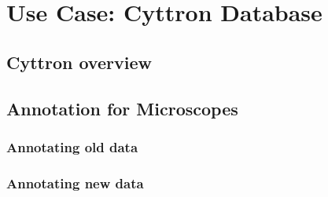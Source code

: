 
\chapter{Use Case: Cyttron Database} %

\label{Chapter4} %



\section{Cyttron overview}


\section{Annotation for Microscopes}


\subsection{Annotating old data}


\subsection{Annotating new data}


